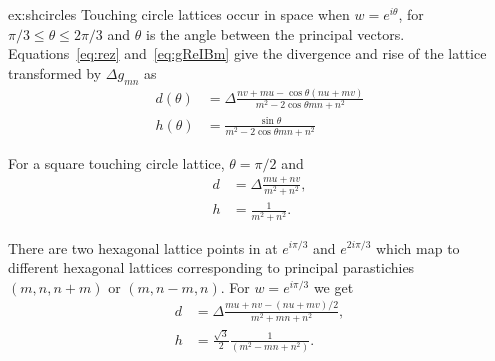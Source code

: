 \begin{jAnswer}{ex:shcircles}
Touching circle lattices occur in  space when $w=e^{i\theta}$, for $\pi/3\leq\theta\leq2\pi/3$ and $\theta$ is the angle between the principal vectors. 
Equations~\eqref{eq:rez} and~\eqref{eq:gReIBm} give the divergence and rise of the lattice transformed by $\Delta g_{mn}$ as 
\begin{align}
	d(\theta) &= 
	\Delta \frac{n v + m u	- \cos\theta ( n u + m v)}{m^2-2 \cos \theta mn +n^2   } 
	\\
	h(\theta) &=
	\frac{	\sin\theta}{m^2-2 \cos \theta mn +n^2   }
	\label{eq:tchd}
\end{align}

For a square touching circle lattice, $\theta=\pi/2$ and 
\begin{align}
	d &= \Delta \frac{ m u +  n v   }{m^2 +  n^2},
	\\
	h  &= \frac{1}{m^2 + n^2}.
\end{align}

There are two hexagonal lattice points in  at $e^{i\pi/3}$ and $e^{2i\pi/3}$ which map to different hexagonal lattices corresponding to principal parastichies  $(m,n,n+m)$ or  $(m,n-m,n)$. For $w= e^{i\pi/3}$ we get
	\begin{align}
	d &= \Delta \frac{ m u +  n v- (n u + mv)/2   }{m^2 + m n + n^2},
	\\
	h  &= \frac{\sqrt{3}}{2} \frac{1}{\left(m^2 -  mn +n^2 \right)}  .
	\end{align}
	
\end{jAnswer}

